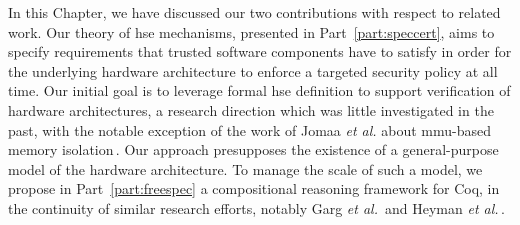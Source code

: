 In this Chapter, we have discussed our two contributions with respect to related
work.
%
Our theory of \ac{hse} mechanisms, presented in Part~\ref{part:speccert}, aims
to specify requirements that trusted software components have to satisfy in
order for the underlying hardware architecture to enforce a targeted security
policy at all time.
%
Our initial goal is to leverage formal \ac{hse} definition to support
verification of hardware architectures, a research direction which was little
investigated in the past, with the notable exception of the work of Jomaa
\emph{et al.} about \ac{mmu}-based memory isolation\,\cite{jomaa2016mmu}.
%
Our approach presupposes the existence of a general-purpose model of the
hardware architecture.
%
To manage the scale of such a model, we propose in Part~\ref{part:freespec} a
compositional reasoning framework for Coq, in the continuity of similar research
efforts, notably Garg \emph{et al.}\,\cite{garg2010compositional} and Heyman
\emph{et al.}\,\cite{heyman2012securemodel}.
